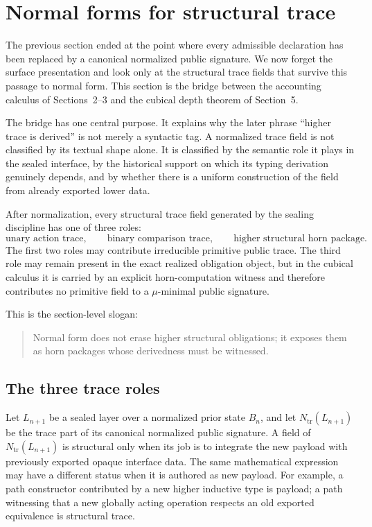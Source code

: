 \section{Normal forms for structural trace}

The previous section ended at the point where every admissible declaration has been replaced
by a canonical normalized public signature.  We now forget the surface presentation and look
only at the structural trace fields that survive this passage to normal form.  This section is
the bridge between the accounting calculus of Sections~2--3 and the cubical depth theorem of
Section~5.

The bridge has one central purpose.  It explains why the later phrase ``higher trace is
derived'' is not merely a syntactic tag.  A normalized trace field is not classified by its
textual shape alone.  It is classified by the semantic role it plays in the sealed interface,
by the historical support on which its typing derivation genuinely depends, and by whether
there is a uniform construction of the field from already exported lower data.

After normalization, every structural trace field generated by the sealing discipline has one
of three roles:
\[
  \text{unary action trace},
  \qquad
  \text{binary comparison trace},
  \qquad
  \text{higher structural horn package}.
\]
The first two roles may contribute irreducible primitive public trace.  The third role may
remain present in the exact realized obligation object, but in the cubical calculus it is
carried by an explicit horn-computation witness and therefore contributes no primitive field
to a \(\mu\)-minimal public signature.

This is the section-level slogan:
\begin{quote}
Normal form does not erase higher structural obligations; it exposes them as horn packages
whose derivedness must be witnessed.
\end{quote}

\subsection{The three trace roles}

Let \(L_{n+1}\) be a sealed layer over a normalized prior state \(B_n\), and let
\(N_{\mathrm{tr}}(L_{n+1})\) be the trace part of its canonical normalized public signature.
A field of \(N_{\mathrm{tr}}(L_{n+1})\) is structural only when its job is to integrate the new
payload with previously exported opaque interface data.  The same mathematical expression
may have a different status when it is authored as new payload.  For example, a path
constructor contributed by a new higher inductive type is payload; a path witnessing that a
new globally acting operation respects an old exported equivalence is structural trace.

